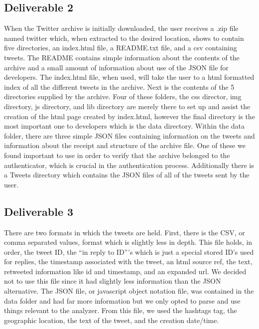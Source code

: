 \documentclass[a4paper, 12pt]{article}
\begin{document}
\subsection*{Deliverable 2} \label{sec:two}
When the Twitter archive is initially downloaded, the user receives a .zip file named twitter which, when extracted to the desired location, shows to contain five directories, an index.html file, a README.txt file, and a csv containing tweets.  The README contains simple information about the contents of the archive and a small amount of information about use of the JSON file for developers.  The index.html file, when used, will take the user to a html formatted index of all the different tweets in the archive.  Next is the contents of the 5 directories supplied by the archive.  Four of these folders, the css director, img directory, js directory, and lib directory are merely there to set up and assist the creation of the html page created by index.html, however the final directory is the most important one to developers which is the data directory.  Within the data folder, there are three simple JSON files containing information on the tweets and information about the receipt and structure of the archive file.  One of these we found important to use in order to verify that the archive belonged to the authenticator, which is crucial in the authentication process.  Additionally there is a Tweets directory which contains the JSON files of all of the tweets sent by the user. 

\subsection*{Deliverable 3} \label{sec:three}
There are two formats in which the tweets are held.  First, there is the CSV, or comma separated values, format which is slightly less in depth.  This file holds, in order, the tweet ID, the “in reply to ID”’s which is just a special stored ID’s used for replies, the timestamp associated with the tweet, an html source ref, the text, retweeted information like id and timestamp, and an expanded url.  We decided not to use this file since it had slightly less information than the JSON alternative.  The JSON file, or javascript object notation file, was contained in the data folder and had far more information but we only opted to parse and use things relevant to the analyzer.  From this file, we used the hashtags tag, the geographic location, the text of the tweet, and the creation date/time.
\pagebreak
\end{document}
